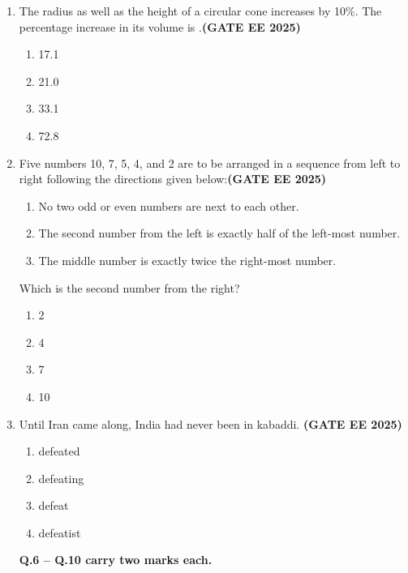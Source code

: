 \documentclass[journal,12pt,onecolumn]{IEEEtran}
\theoremstyle{remark}
\begin{document}
\begin{enumerate}
\item The radius as well as the height of a circular cone increases by 10\%. The percentage increase in its volume is \underline{\hspace{1cm}}.\hfill \textbf{(GATE EE 2025)}\\

\begin{enumerate} 
    \item 17.1
    \item 21.0
    \item 33.1
    \item 72.8
\end{enumerate}

\item Five numbers 10, 7, 5, 4, and 2 are to be arranged in a sequence from left to right following the directions given below:\hfill \textbf{(GATE EE 2025)}\\

\begin{enumerate}
    \item No two odd or even numbers are next to each other.
    \item The second number from the left is exactly half of the left-most number.
    \item The middle number is exactly twice the right-most number.
\end{enumerate}

Which is the second number from the right?

\begin{enumerate} 
    \item 2
    \item 4
    \item 7
    \item 10
\end{enumerate}

\item Until Iran came along, India had never been \underline{\hspace{1cm}} in kabaddi.
\hfill \textbf{(GATE EE 2025)}\\
\begin{enumerate} 
    \item defeated
    \item defeating
    \item defeat
    \item defeatist
\end{enumerate}

\textbf {Q.6 -- Q.10 carry two marks each.}


\end{enumerate}
\end{document}
